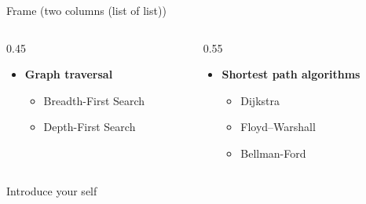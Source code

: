 \documentclass[aspectratio=169]{beamer}
\renewcommand{\alert}[1]{\textbf{\color{swufe}#1}}
\begin{document}
        \begin{frame}{Frame (two columns (list of list))}
            \begin{columns}[t] %
                \begin{column}{0.45\textwidth}
                    \begin{itemize}
                        \item \alert{Graph traversal}
                        \begin{itemize}
                            \item Breadth-First Search
                            \item Depth-First Search
                        \end{itemize}
                    \end{itemize}
                \end{column}
                \begin{column}{0.55\textwidth}
                    \begin{itemize}
                        \item \alert{Shortest path algorithms}
                        \begin{itemize}
                            \item Dijkstra
                            \item Floyd–Warshall
                            \item Bellman-Ford
                        \end{itemize}
                    \end{itemize}
                \end{column}
            \end{columns}

            \begin{note}
                {Introduce your self}
            \end{note}
        \end{frame}
\end{document}
